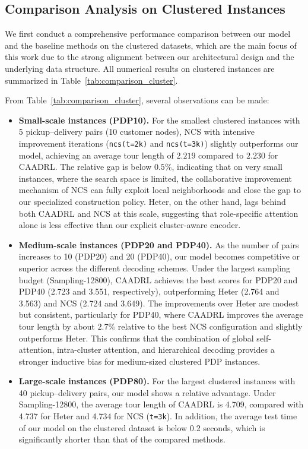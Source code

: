 \documentclass[pdflatex,sn-basic,Numbered]{sn-jnl}
\begin{document}
\subsection{Comparison Analysis on Clustered Instances}

We first conduct a comprehensive performance comparison between our model and the baseline methods on the clustered datasets, which are the main focus of this work due to the strong alignment between our architectural design and the underlying data structure. All numerical results on clustered instances are summarized in Table~\ref{tab:comparison_cluster}.

From Table~\ref{tab:comparison_cluster}, several observations can be made:

\begin{itemize}
    \item \textbf{Small-scale instances (PDP10).} For the smallest clustered instances with 5 pickup--delivery pairs (10 customer nodes), NCS with intensive improvement iterations (\texttt{ncs(t=2k)} and \texttt{ncs(t=3k)}) slightly outperforms our model, achieving an average tour length of $2.219$ compared to $2.230$ for CAADRL. The relative gap is below $0.5\%$, indicating that on very small instances, where the search space is limited, the collaborative improvement mechanism of NCS can fully exploit local neighborhoods and close the gap to our specialized construction policy. Heter, on the other hand, lags behind both CAADRL and NCS at this scale, suggesting that role-specific attention alone is less effective than our explicit cluster-aware encoder.

    \item \textbf{Medium-scale instances (PDP20 and PDP40).} As the number of pairs increases to 10 (PDP20) and 20 (PDP40), our model becomes competitive or superior across the different decoding schemes. Under the largest sampling budget (Sampling-12800), CAADRL achieves the best scores for PDP20 and PDP40 (2.723 and 3.551, respectively), outperforming Heter (2.764 and 3.563) and NCS (2.724 and 3.649). The improvements over Heter are modest but consistent, particularly for PDP40, where CAADRL improves the average tour length by about $2.7\%$ relative to the best NCS configuration and slightly outperforms Heter. This confirms that the combination of global self-attention, intra-cluster attention, and hierarchical decoding provides a stronger inductive bias for medium-sized clustered PDP instances.


    \item \textbf{Large-scale instances (PDP80).} For the largest clustered instances with 40 pickup--delivery pairs, our model shows a relative advantage. Under Sampling-12800, the average tour length of CAADRL is 4.709, compared with 4.737 for Heter and 4.734 for NCS (\texttt{t=3k}). In addition, the average test time of our model on the clustered dataset is below 0.2 seconds, which is significantly shorter than that of the compared methods.
\end{itemize}
\end{document}
